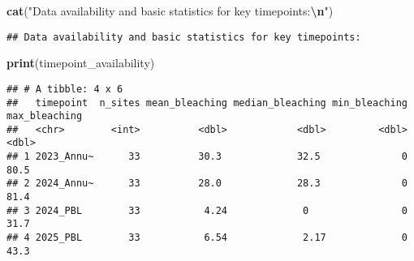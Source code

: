 \documentclass[
]{article}
\newenvironment{Shaded}{\begin{snugshade}}{\end{snugshade}}
\newcommand{\FunctionTok}[1]{\textcolor[rgb]{0.13,0.29,0.53}{\textbf{#1}}}
\newcommand{\NormalTok}[1]{#1}
\newcommand{\SpecialCharTok}[1]{\textcolor[rgb]{0.81,0.36,0.00}{\textbf{#1}}}
\newcommand{\StringTok}[1]{\textcolor[rgb]{0.31,0.60,0.02}{#1}}
\begin{document}
\begin{Shaded}
\begin{Highlighting}[]
\FunctionTok{cat}\NormalTok{(}\StringTok{"Data availability and basic statistics for key timepoints:}\SpecialCharTok{\textbackslash{}n}\StringTok{"}\NormalTok{)}
\end{Highlighting}
\end{Shaded}

\begin{verbatim}
## Data availability and basic statistics for key timepoints:
\end{verbatim}

\begin{Shaded}
\begin{Highlighting}[]
\FunctionTok{print}\NormalTok{(timepoint\_availability)}
\end{Highlighting}
\end{Shaded}

\begin{verbatim}
## # A tibble: 4 x 6
##   timepoint  n_sites mean_bleaching median_bleaching min_bleaching max_bleaching
##   <chr>        <int>          <dbl>            <dbl>         <dbl>         <dbl>
## 1 2023_Annu~      33          30.3             32.5              0          80.5
## 2 2024_Annu~      33          28.0             28.3              0          81.4
## 3 2024_PBL        33           4.24             0                0          31.7
## 4 2025_PBL        33           6.54             2.17             0          43.3
\end{verbatim}
\end{document}
